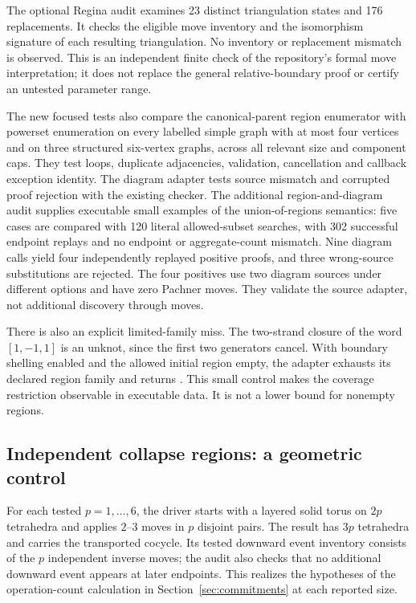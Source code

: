 The optional Regina audit examines 23 distinct triangulation states and
176 replacements. It checks the eligible move inventory and the isomorphism
signature of each resulting triangulation. No inventory or replacement
mismatch is observed. This is an independent finite check of the repository's
formal move interpretation; it does not replace the general relative-boundary
proof or certify an untested parameter range.

The new focused tests also compare the canonical-parent region enumerator
with powerset enumeration on every labelled simple graph with at most four
vertices and on three structured six-vertex graphs, across all relevant size
and component caps. They test loops, duplicate adjacencies, validation,
cancellation and callback exception identity. The diagram adapter tests
source mismatch and corrupted proof rejection with the existing checker.
The additional region-and-diagram audit supplies executable small examples
of the union-of-regions semantics: five cases are compared with 120 literal
allowed-subset searches, with 302 successful endpoint replays and no
endpoint or aggregate-count mismatch. Nine diagram calls yield four
independently replayed positive proofs, and three wrong-source substitutions
are rejected. The four positives use two diagram sources under different
options and have zero Pachner moves. They validate the source adapter, not
additional discovery through moves.

There is also an explicit limited-family miss. The two-strand closure of
the word $[1,-1,1]$ is an unknot, since the first two generators cancel.
With boundary shelling enabled and the allowed initial region empty, the
adapter exhausts its declared region family and returns
. This small control makes the coverage restriction
observable in executable data. It is not a lower bound for nonempty regions.

\subsection{Independent collapse regions: a geometric control}

For each tested $p=1,\ldots,6$, the driver starts with a layered solid torus
on $2p$ tetrahedra and applies $2$--$3$ moves in $p$ disjoint pairs. The
result has $3p$ tetrahedra and carries the transported cocycle. Its tested
downward event inventory consists of the $p$ independent inverse moves;
the audit also checks that no additional downward event appears at later
endpoints. This realizes the hypotheses of the operation-count calculation
in Section~\ref{sec:commitments} at each reported size.

